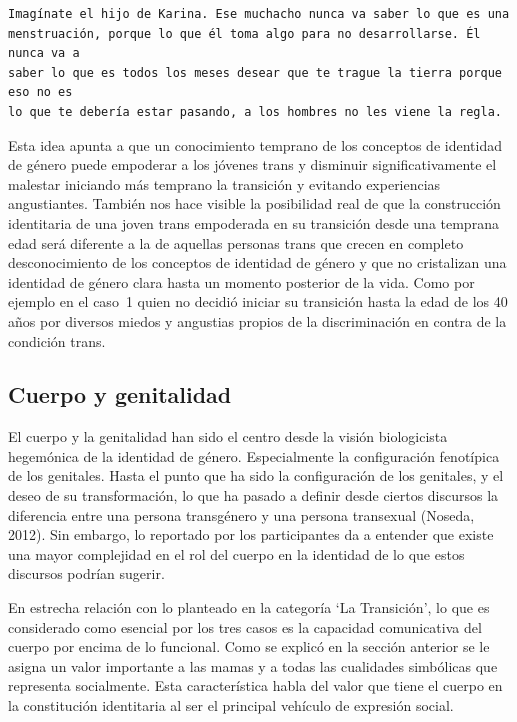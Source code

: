 \begin{verbatim}
Imagínate el hijo de Karina. Ese muchacho nunca va saber lo que es una
menstruación, porque lo que él toma algo para no desarrollarse. Él nunca va a
saber lo que es todos los meses desear que te trague la tierra porque eso no es
lo que te debería estar pasando, a los hombres no les viene la regla.
\end{verbatim}

Esta idea apunta a que un conocimiento temprano de los conceptos de identidad de
género puede empoderar a los jóvenes trans y disminuir significativamente el
malestar iniciando más temprano la transición y evitando experiencias
angustiantes. También nos hace visible la posibilidad real de que la
construcción identitaria de una joven trans empoderada en su transición desde
una temprana edad será diferente a la de aquellas personas trans que crecen en
completo desconocimiento de los conceptos de identidad de género y que no
cristalizan una identidad de género clara hasta un momento posterior de la vida.
Como por ejemplo en el caso~1 quien no decidió iniciar su transición hasta la
edad de los 40 años por diversos miedos y angustias propios de la discriminación
en contra de la condición trans.

\subsection{Cuerpo y genitalidad}

El cuerpo y la genitalidad han sido el centro desde la visión biologicista
hegemónica de la identidad de género. Especialmente la configuración fenotípica
de los genitales. Hasta el punto que ha sido la configuración de los genitales,
y el deseo de su transformación, lo que ha pasado a definir desde ciertos
discursos la diferencia entre una persona transgénero y una persona transexual
(Noseda, 2012). Sin embargo, lo reportado por los participantes da a entender
que existe una mayor complejidad en el rol del cuerpo en la identidad de lo que
estos discursos podrían sugerir.

En estrecha relación con lo planteado en la categoría ‘La Transición’, lo que es
considerado como esencial por los tres casos es la capacidad comunicativa del
cuerpo por encima de lo funcional. Como se explicó en la sección anterior se le
asigna un valor importante a las mamas y a todas las cualidades simbólicas que
representa socialmente. Esta característica habla del valor que tiene el cuerpo
en la constitución identitaria al ser el principal vehículo de expresión social.

